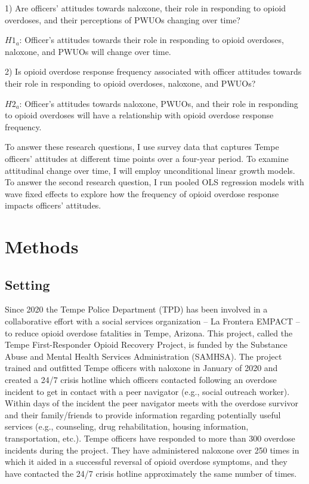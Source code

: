 1) Are officers’ attitudes towards naloxone, their role in responding to opioid overdoses, and their perceptions of PWUOs changing over time? 

\begin{flushleft}
\(H1_a\): Officer's attitudes towards their role in responding to opioid overdoses, naloxone, and PWUOs will change over time.
\end{flushleft}

2) Is opioid overdose response frequency associated with officer attitudes towards their role in responding to opioid overdoses, naloxone, and PWUOs? 

\begin{flushleft}
\(H2_a\): Officer's attitudes towards naloxone, PWUOs, and their role in responding to opioid overdoses will have a relationship with opioid overdose response frequency.
\end{flushleft}

To answer these research questions, I use survey data that captures Tempe officers’ attitudes at different time points over a four-year period. To examine attitudinal change over time, I will employ unconditional linear growth models. To answer the second research question, I run pooled OLS regression models with wave fixed effects to explore how the frequency of opioid overdose response impacts officers’ attitudes.

\section{Methods}
\subsection{Setting}

Since 2020 the Tempe Police Department (TPD) has been involved in a collaborative effort with a social services organization – La Frontera EMPACT – to reduce opioid overdose fatalities in Tempe, Arizona. This project, called the Tempe First-Responder Opioid Recovery Project, is funded by the Substance Abuse and Mental Health Services Administration (SAMHSA). The project trained and outfitted Tempe officers with naloxone in January of 2020 and created a 24/7 crisis hotline which officers contacted following an overdose incident to get in contact with a peer navigator (e.g., social outreach worker). Within days of the incident the peer navigator meets with the overdose survivor and their family/friends to provide information regarding potentially useful services (e.g., counseling, drug rehabilitation, housing information, transportation, etc.). Tempe officers have responded to more than 300 overdose incidents during the project. They have administered naloxone over 250 times in which it aided in a successful reversal of opioid overdose symptoms, and they have contacted the 24/7 crisis hotline approximately the same number of times. 

